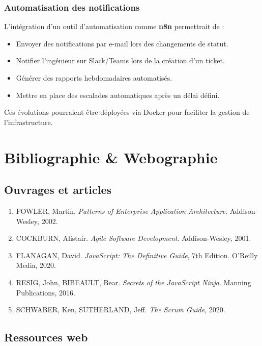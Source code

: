 \documentclass[12pt,a4paper,twoside]{report}
\begin{document}
\subsection{Automatisation des notifications}

L'intégration d'un outil d'automatisation comme \textbf{n8n} permettrait de :
\begin{itemize}
    \item Envoyer des notifications par e-mail lors des changements de statut.
    \item Notifier l'ingénieur sur Slack/Teams lors de la création d'un ticket.
    \item Générer des rapports hebdomadaires automatisés.
    \item Mettre en place des escalades automatiques après un délai défini.
\end{itemize}

Ces évolutions pourraient être déployées via Docker pour faciliter la gestion de l'infrastructure.

\chapter*{Bibliographie \& Webographie}

\section*{Ouvrages et articles}

\begin{enumerate}
    \item FOWLER, Martin. \textit{Patterns of Enterprise Application Architecture}. Addison-Wesley, 2002.
    \item COCKBURN, Alistair. \textit{Agile Software Development}. Addison-Wesley, 2001.
    \item FLANAGAN, David. \textit{JavaScript: The Definitive Guide}, 7th Edition. O'Reilly Media, 2020.
    \item RESIG, John, BIBEAULT, Bear. \textit{Secrets of the JavaScript Ninja}. Manning Publications, 2016.
    \item SCHWABER, Ken, SUTHERLAND, Jeff. \textit{The Scrum Guide}, 2020.
\end{enumerate}

\section*{Ressources web}
\end{document}
